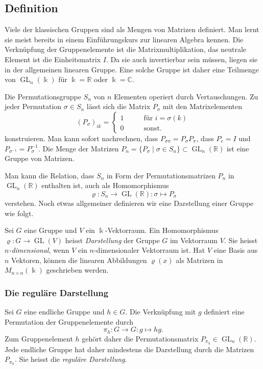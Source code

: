 %
%
%

%
%
\subsection{Definition}
Viele der klassischen Gruppen sind als Mengen von Matrizen definiert.
Man lernt sie meist bereits in einem Einführungskurs zur linearen Algebra
kennen.
Die Verknüpfung der Gruppenelemente ist die Matrixmultiplikation,
das neutrale Element ist die Einheitsmatrix $I$.
Da sie auch invertierbar sein müssen, liegen sie in der 
allgemeinen linearen Gruppe.
Eine solche Gruppe ist daher eine Teilmenge von $\operatorname{GL}_n(\Bbbk)$
für $\Bbbk=\mathbb{R}$ oder $\Bbbk=\mathbb{C}$.

Die Permutationsgruppe $S_n$ von $n$ Elementen operiert durch 
Vertauschungen.
Zu jeder Permutation $\sigma\in S_n$ lässt sich die Matrix $P_\sigma$
mit den Matrixelementen
\[
(P_\sigma)_{ik}
=
\begin{cases}
1&\qquad\text{für $i=\sigma(k)$}\\
0&\qquad\text{sonst}.
\end{cases}
\]
konstruieren.
Man kann sofort nachrechnen, dass $P_{\sigma\pi} = P_\sigma P_\pi$,
dass $P_{e}=I$ und $P_{\sigma^{-1}}=P_\sigma^{-1}$.
Die Menge der Matrizen
$P_n=\{P_\sigma\mid\sigma\in S_n\}\subset\operatorname{GL}_n(\mathbb{R})$
ist eine Gruppe von Matrizen.

Man kann die Relation, dass $S_n$ in Form der Permutationsmatrizen $P_n$
in $\operatorname{GL}_n(\mathbb{R})$ enthalten ist, auch als Homomorphismus
\[
\varrho
\colon 
S_n
\to
\operatorname{GL}(\mathbb{R})
:
\sigma
\mapsto
P_\sigma
\]
verstehen.
Noch etwas allgemeiner definieren wir eine Darstellung einer Gruppe
wie folgt.

\begin{definition}[Darstellung]
Sei $G$ eine Gruppe und $V$ ein $\Bbbk$-Vektorraum.
Ein Homomorphismus $\varrho\colon G\to\operatorname{GL}(V)$
heisst {\em Darstellung} der Gruppe $G$ im Vektorraum $V$.
Sie heisst {\em $n$-dimensional}, wenn $V$ ein $n$-di\-men\-sio\-na\-ler
Vektorraum ist.
Hat $V$ eine Basis aus $n$ Vektoren, können die linearen
Abbildungen $\varrho(x)$ als Matrizen in $M_{n\times n}(\Bbbk)$
geschrieben werden.
\end{definition}

%
%
\subsubsection{Die reguläre Darstellung}
Sei $G$ eine endliche Gruppe und $h\in G$.
Die Verknüpfung mit $g$ definiert eine Permutation der Gruppenelemente
durch
\[
\pi_h \colon G \to G : g \mapsto hg.
\]
Zum Gruppenelement $h$ gehört daher die Permutationsmatrix
$P_{\pi_h}\in\operatorname{GL}_n(\mathbb{R})$.
Jede endliche Gruppe hat daher mindestens die Darstellung durch die
Matrizen $P_{\pi_h}$.
Sie heisst die {\em reguläre Darstellung}.

